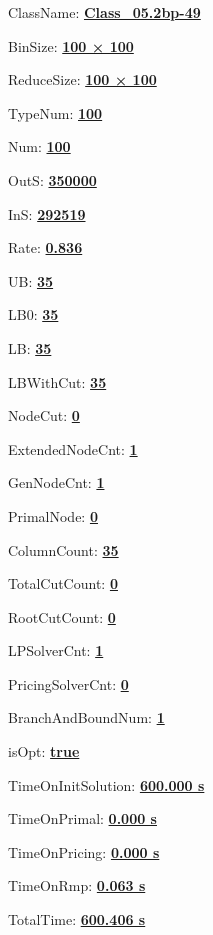 \documentclass[11pt]{article}
\begin{document}
\pagestyle{empty}


ClassName: \underline{\textbf{Class_05.2bp-49}}
\par
BinSize: \underline{\textbf{100 × 100}}
\par
ReduceSize: \underline{\textbf{100 × 100}}
\par
TypeNum: \underline{\textbf{100}}
\par
Num: \underline{\textbf{100}}
\par
OutS: \underline{\textbf{350000}}
\par
InS: \underline{\textbf{292519}}
\par
Rate: \underline{\textbf{0.836}}
\par
UB: \underline{\textbf{35}}
\par
LB0: \underline{\textbf{35}}
\par
LB: \underline{\textbf{35}}
\par
LBWithCut: \underline{\textbf{35}}
\par
NodeCut: \underline{\textbf{0}}
\par
ExtendedNodeCnt: \underline{\textbf{1}}
\par
GenNodeCnt: \underline{\textbf{1}}
\par
PrimalNode: \underline{\textbf{0}}
\par
ColumnCount: \underline{\textbf{35}}
\par
TotalCutCount: \underline{\textbf{0}}
\par
RootCutCount: \underline{\textbf{0}}
\par
LPSolverCnt: \underline{\textbf{1}}
\par
PricingSolverCnt: \underline{\textbf{0}}
\par
BranchAndBoundNum: \underline{\textbf{1}}
\par
isOpt: \underline{\textbf{true}}
\par
TimeOnInitSolution: \underline{\textbf{600.000 s}}
\par
TimeOnPrimal: \underline{\textbf{0.000 s}}
\par
TimeOnPricing: \underline{\textbf{0.000 s}}
\par
TimeOnRmp: \underline{\textbf{0.063 s}}
\par
TotalTime: \underline{\textbf{600.406 s}}
\par
\newpage


\end{document}
